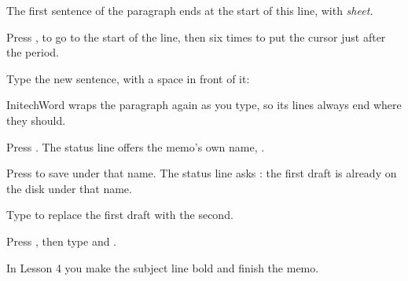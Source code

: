 The first sentence of the paragraph ends at the start of this line, with
\textit{sheet.}
\begin{WPSteps}
\item Press ,  to go to the start of the line,
then  six times to put the cursor just after the period.
\item Type the new sentence, with a space in front of it:
\end{WPSteps}
InitechWord wraps the paragraph again as you type, so its lines always end
where they should.

\begin{WPSteps}
\item Press .  The status line offers the memo's own name,
.
\item Press  to save under that name.  The status line asks
: the first draft is already on the disk
under that name.
\item Type  to replace the first draft with the second.
\end{WPSteps}

\begin{WPSteps}
\item Press , then type  and .
\end{WPSteps}
\EndReplay
In Lesson 4 you make the subject line bold and finish the memo.
